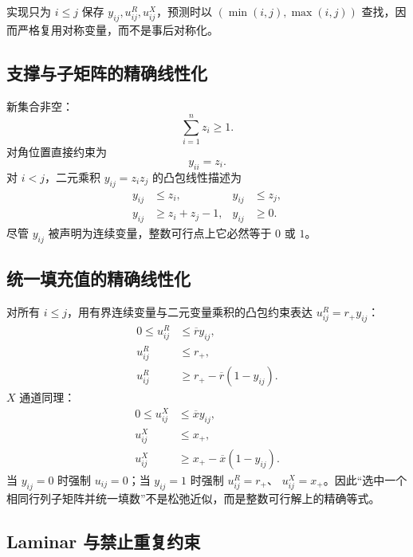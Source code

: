 \documentclass[UTF8,11pt]{ctexart}
\begin{document}
实现只为 $i\le j$ 保存 $y_{ij},u^R_{ij},u^X_{ij}$，预测时以
$(\min(i,j),\max(i,j))$ 查找，因而严格复用对称变量，而不是事后对称化。

\subsection{支撑与子矩阵的精确线性化}

新集合非空：
\begin{equation}
 \sum_{i=1}^{n}z_i\ge1.
 \label{eq:nonempty}
\end{equation}
对角位置直接约束为
\begin{equation}
 y_{ii}=z_i.
 \label{eq:diag}
\end{equation}
对 $i<j$，二元乘积 $y_{ij}=z_i z_j$ 的凸包线性描述为
\begin{align}
 y_{ij}&\le z_i,& y_{ij}&\le z_j,\label{eq:y-upper}\\
 y_{ij}&\ge z_i+z_j-1,& y_{ij}&\ge0.\label{eq:y-lower}
\end{align}
尽管 $y_{ij}$ 被声明为连续变量，整数可行点上它必然等于 $0$ 或 $1$。

\subsection{统一填充值的精确线性化}

对所有 $i\le j$，用有界连续变量与二元变量乘积的凸包约束表达
$u^R_{ij}=r_+y_{ij}$：
\begin{align}
 0\le u^R_{ij}&\le \overline r y_{ij},\label{eq:ur1}\\
 u^R_{ij}&\le r_+,\label{eq:ur2}\\
 u^R_{ij}&\ge r_+-\overline r(1-y_{ij}).\label{eq:ur3}
\end{align}
$X$ 通道同理：
\begin{align}
 0\le u^X_{ij}&\le \overline x y_{ij},\\
 u^X_{ij}&\le x_+,\\
 u^X_{ij}&\ge x_+-\overline x(1-y_{ij}).
\end{align}
当 $y_{ij}=0$ 时强制 $u_{ij}=0$；当 $y_{ij}=1$ 时强制 $u^R_{ij}=r_+$、
$u^X_{ij}=x_+$。因此“选中一个相同行列子矩阵并统一填数”不是松弛近似，而是整数可行解上的精确等式。

\subsection{Laminar 与禁止重复约束}
\end{document}
